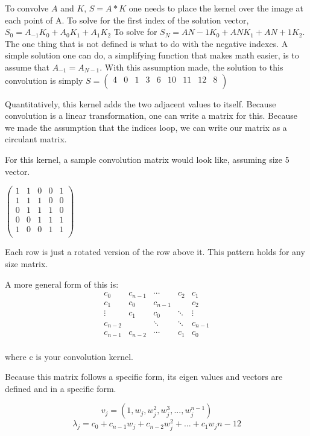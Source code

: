 \documentclass[11pt]{article}
\begin{document}
To convolve $A$ and $K$, $S = A*K$ one needs to place the kernel over the image at each point of A. To solve for the first index of the solution vector, $S_0 = A_{-1}K_{0}+A_{0}K_{1}+A_{1}K_{2}$ To solve for $S_N = A{N-1}K_{0}+A{N}K_{1}+A{N+1}K_{2}$. The one thing that is not defined is what to do with the negative indexes. A simple solution one can do, a simplifying function that makes math easier, is to assume that $A_{-1} = A_{N-1}$. With this assumption made, the solution to this convolution is simply 
$ S = \begin{pmatrix}
	4 & 0 & 1 & 3 & 6 & 10 & 11 & 12 & 8\\
\end{pmatrix}$

Quantitatively, this kernel adds the two adjacent values to itself. Because convolution is a linear transformation, one can write a matrix for this. Because we made the assumption that the indices loop, we can write our matrix as a circulant matrix. 

For this kernel, a sample convolution matrix would look like, assuming size 5 vector. 

$\begin{pmatrix}
	1 & 1 & 0 & 0 & 1\\
	1 & 1 & 1 & 0 & 0\\
	0 & 1 & 1 & 1 & 0\\
	0 & 0 & 1 & 1 & 1 \\
	1 & 0 & 0 & 1 & 1\\
\end{pmatrix}$

Each row is just a rotated version of the row above it. This pattern holds for any size matrix.

A more general form of this is:
$$\begin{matrix}
	c_0 & c_{n-1} & \cdots & c_2 & c_1\\
	c_1 & c_0 & c_{n-1} &  & c_2\\
	\vdots & c_1 & c_0 & \ddots & \vdots\\
	c_{n-2} &   & \ddots & \ddots & c_{n-1}\\
	c_{n-1} & c_{n-2} & \cdots & c_1 & c_0\\
\end{matrix}$$

where c is your convolution kernel. 

Because this matrix follows a specific form, its eigen values and vectors are defined and in a specific form.

$$v_j = (1, w_j, w_j^2, w_j^3, ..., w_j^{n-1})$$
$$\lambda_j =c_0+c_{n-1}w_j	+c_{n-2}w_j^2+...+c_{1}w_j{n-1}2$$
\end{document}
